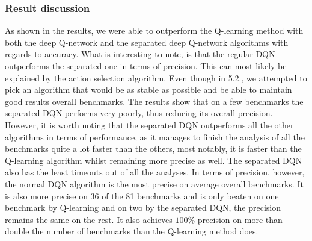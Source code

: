 \subsubsection{Result discussion}
As shown in the results, we were able to outperform the Q-learning method with both the deep Q-network and the separated deep Q-network algorithms with regards to accuracy. What is interesting to note, is that the regular DQN outperforms the separated one in terms of precision. This can most likely be explained by the action selection algorithm. Even though in 5.2., we attempted to pick an algorithm that would be as stable as possible and be able to maintain good results overall benchmarks. The results show that on a few benchmarks the separated DQN performs very poorly, thus reducing its overall precision. However, it is worth noting that the separated DQN outperforms all the other algorithms in terms of performance, as it manages to finish the analysis of all the benchmarks quite a lot faster than the others, most notably, it is faster than the Q-learning algorithm whilst remaining more precise as well. The separated DQN also has the least timeouts out of all the analyses. In terms of precision, however, the normal DQN algorithm is the most precise on average overall benchmarks. It is also more precise on 36 of the 81 benchmarks and is only beaten on one benchmark by Q-learning and on two by the separated DQN, the precision remains the same on the rest. It also achieves $100\%$ precision on more than double the number of benchmarks than the Q-learning method does.  
































